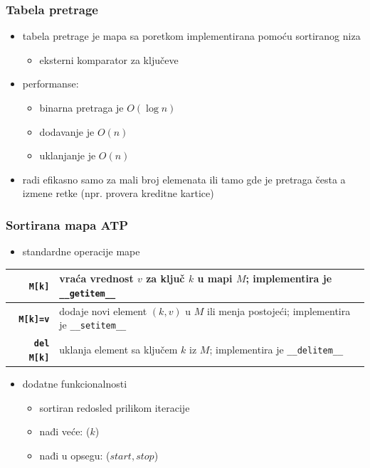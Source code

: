 \documentclass[compress,aspectratio=169]{beamer}
\begin{document}
\begin{frame}[fragile]
  \frametitle{Tabela pretrage}
  \begin{itemize}
    \item tabela pretrage je mapa sa poretkom implementirana pomoću sortiranog niza 
    \begin{itemize}
      \item eksterni komparator za ključeve
    \end{itemize}
    \item performanse: 
    \begin{itemize}
      \item binarna pretraga je $O(\log n)$
      \item dodavanje je $O(n)$
      \item uklanjanje je $O(n)$
    \end{itemize}
    \item radi efikasno samo za mali broj elemenata ili tamo gde je pretraga česta a izmene retke (npr. provera kreditne kartice) 
  \end{itemize}
\end{frame}

\begin{frame}[fragile]
  \frametitle{Sortirana mapa ATP}
  \begin{itemize}
    \item standardne operacije mape 
  \end{itemize}
  \begin{center}
    \begin{tabular}{rp{8cm}}
      \textbf{\texttt{M[k]}} & vraća vrednost $v$ za ključ $k$ u mapi $M$; implementira je \texttt{\_\_getitem\_\_} \\ \hline
      \textbf{\texttt{M[k]=v}} & dodaje novi element $(k, v)$ u $M$ ili menja postojeći; implementira je \texttt{\_\_setitem\_\_} \\ \hline
      \textbf{\texttt{del M[k]}} & uklanja element sa ključem $k$ iz $M$; implementira je \texttt{\_\_delitem\_\_} \\
    \end{tabular}
  \end{center}
  \begin{itemize}
    \item dodatne funkcionalnosti 
    \begin{itemize}
      \item sortiran redosled prilikom iteracije
      \item nađi veće: ($k$)
      \item nađi u opsegu: ($start, stop$) 
    \end{itemize}
  \end{itemize}
\end{frame}
\end{document}
